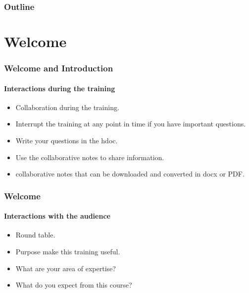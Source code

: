 
\begin{frame}
    \maketitle
\end{frame}

\begin{frame}
\frametitle{Outline}
\tableofcontents
\end{frame}
\section{Welcome}


\begin{frame}
	\frametitle{Welcome and Introduction}
	\framesubtitle{Interactions during the training}
	\begin{itemize}
		\item Collaboration during the training.
		\item Interrupt the training at any point in time if you have important questions.
		\item Write your questions in the hdoc.
		\item Use the collaborative notes to share information.
		\item collaborative notes that can be downloaded and converted in docx or PDF.
	\end{itemize}
\end{frame}

\begin{frame}
	\frametitle{Welcome}
	\framesubtitle{Interactions with the audience}
	\begin{itemize}
		\item Round table.
		\item Purpose make this training useful.
		\item What are your area of expertise?
		\item What do you expect from this course?
	\end{itemize}
\end{frame}


